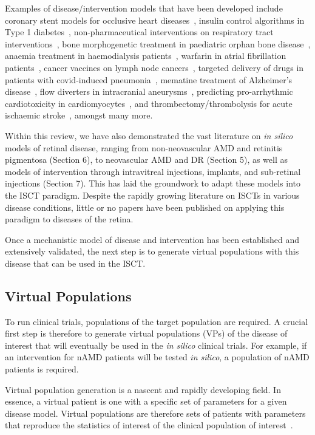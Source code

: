 \documentclass{article}
\begin{document}
Examples of disease/intervention models that have been developed include coronary stent models for occlusive heart diseases~\cite{Antonini2021, Berti2021}, insulin control algorithms in Type 1 diabetes~\cite{Kovatchev2009}, non-pharmaceutical interventions on respiratory tract interventions~\cite{Arsene2022}, bone morphogenetic treatment in paediatric orphan bone disease~\cite{Carlier2018}, anaemia treatment in haemodialysis patients~\cite{Fuertinger2018}, warfarin in atrial fibrillation patients~\cite{Ravvaz2017}, cancer vaccines on lymph node cancers~\cite{Gaffney2022}, targeted delivery of drugs in patients with covid-induced pneumonia~\cite{Wang2022}, mematine treatment of Alzheimer’s disease~\cite{Swietlik2022}, flow diverters in intracranial aneurysms~\cite{SarramiForoushani2021}, predicting pro-arrhythmic cardiotoxicity in cardiomyocytes~\cite{Passini2017}, and thrombectomy/thrombolysis for acute ischaemic stroke~\cite{Konduri2020}, amongst many more.

Within this review, we have also demonstrated the vast literature on \textit{in silico} models of retinal disease, ranging from non-neovascular AMD and retinitis pigmentosa (Section 6), to neovascular AMD and DR (Section 5), as well as models of intervention through intravitreal injections, implants, and sub-retinal injections (Section 7). This has laid the groundwork to adapt these models into the ISCT paradigm. Despite the rapidly growing literature on ISCTs in various disease conditions, little or no papers have been published on applying this paradigm to diseases of the retina.

Once a mechanistic model of disease and intervention has been established and extensively validated, the next step is to generate virtual populations with this disease that can be used in the ISCT.

\subsection{Virtual Populations}

To run clinical trials, populations of the target population are required. A crucial first step is therefore to generate virtual populations (VPs) of the disease of interest that will eventually be used in the \textit{in silico} clinical trials. For example, if an intervention for nAMD patients will be tested \textit{in silico}, a population of nAMD patients is required.

Virtual population generation is a nascent and rapidly developing field. In essence, a virtual patient is one with a specific set of parameters for a given disease model. Virtual populations are therefore sets of patients with parameters that reproduce the statistics of interest of the clinical population of interest~\cite{Allen2016}.
\end{document}
